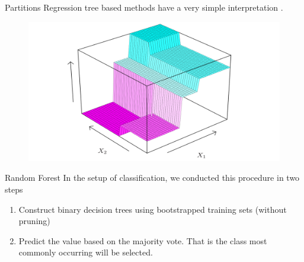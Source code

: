\documentclass[11pt, aspectratio=43]{beamer}
\begin{document}
\begin{frame}{Partitions}
	Regression tree based methods have a very simple interpretation .
	
	\begin{figure}[h]
		\centering
		\includegraphics{Figures/3dtreepic.png}
	\end{figure}		

\end{frame}


\begin{frame}{Random Forest}
	In the setup of classification, we conducted this procedure in two steps
	\begin{enumerate}
		\item Construct binary decision trees using bootstrapped training sets (without pruning)
		\item Predict the value based on the majority vote. That is the class most commonly occurring will be selected. 
	\end{enumerate}	


\end{frame}
\end{document}
